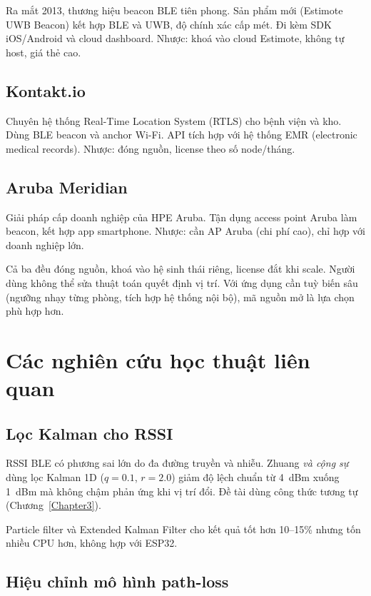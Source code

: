 Ra mắt 2013, thương hiệu beacon BLE tiên phong. Sản phẩm mới (Estimote UWB Beacon) kết hợp BLE và UWB, độ chính xác cấp mét. Đi kèm SDK iOS/Android và cloud dashboard. Nhược: khoá vào cloud Estimote, không tự host, giá thẻ cao.

\subsection{Kontakt.io}

Chuyên hệ thống Real-Time Location System (RTLS) cho bệnh viện và kho. Dùng BLE beacon và anchor Wi-Fi. API tích hợp với hệ thống EMR (electronic medical records). Nhược: đóng nguồn, license theo số node/tháng.

\subsection{Aruba Meridian}

Giải pháp cấp doanh nghiệp của HPE Aruba. Tận dụng access point Aruba làm beacon, kết hợp app smartphone. Nhược: cần AP Aruba (chi phí cao), chỉ hợp với doanh nghiệp lớn.

Cả ba đều đóng nguồn, khoá vào hệ sinh thái riêng, license đắt khi scale. Người dùng không thể sửa thuật toán quyết định vị trí. Với ứng dụng cần tuỳ biến sâu (ngưỡng nhạy từng phòng, tích hợp hệ thống nội bộ), mã nguồn mở là lựa chọn phù hợp hơn.

\section{Các nghiên cứu học thuật liên quan}

\subsection{Lọc Kalman cho RSSI}

RSSI BLE có phương sai lớn do đa đường truyền và nhiễu. Zhuang \textit{và cộng sự}~\cite{zhuang-kalman-ble} dùng lọc Kalman 1D ($q = 0.1$, $r = 2.0$) giảm độ lệch chuẩn từ 4~dBm xuống 1~dBm mà không chậm phản ứng khi vị trí đổi. Đề tài dùng công thức tương tự (Chương~\ref{Chapter3}).

Particle filter và Extended Kalman Filter cho kết quả tốt hơn 10--15\% nhưng tốn nhiều CPU hơn, không hợp với ESP32.

\subsection{Hiệu chỉnh mô hình path-loss}

